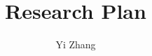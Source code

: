 \documentclass[10pt,a4paper]{article}
\begin{document}
\title{\bf{\Huge{Research Plan}}}

\author{Yi Zhang}




\date{}
\maketitle
\end{document}
